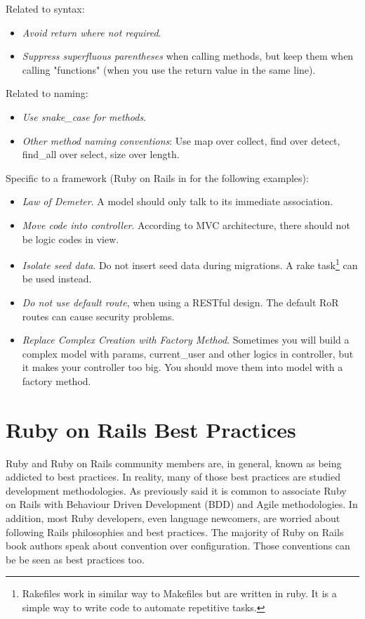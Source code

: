 Related to syntax:
\begin{itemize}
\item \emph{Avoid return where not required}.
\item \emph{Suppress superfluous parentheses} when calling methods, 
but keep them when calling "functions" (when you use the return value in the same line).
\end{itemize}

Related to naming:
\begin{itemize}
\item \emph{Use snake\_case for methods}.
\item \emph{Other method naming conventions}: Use map over collect, find over detect, find\_all over select, size over length.
\end{itemize}

Specific to a framework (Ruby on Rails in for the following examples):
\begin{itemize}
\item \emph{Law of Demeter}. A model should only talk to its immediate association.
\item \emph{Move code into controller}. According to MVC architecture, there should not be logic codes in view.
\item \emph{Isolate seed data}. Do not insert seed data during migrations. A 
rake task\footnote{ 
  Rakefiles work in similar way to Makefiles but are written in ruby. It is a simple way to write code to automate repetitive tasks. 
} can be used instead.
\item \emph{Do not use default route}, when using a RESTful design. The default RoR routes can cause security problems.
\item \emph{Replace Complex Creation with Factory Method}. Sometimes you will build a complex model with params, current\_user and other logics in controller, but it makes your controller too big. You should move them into model with a factory method.
\end{itemize}




\section{Ruby on Rails Best Practices} \label{sec:ror_best_practives}

Ruby and Ruby on Rails community members are, in general, known as being addicted to best practices.
In reality, many of those best practices are studied development methodologies.
As previously said it is common to associate Ruby on Rails with Behaviour Driven Development (BDD) and Agile methodologies.
In addition, most Ruby developers, even language newcomers, are worried about following Rails philosophies and best practices.
The majority of Ruby on Rails book authors speak about convention over configuration.
Those conventions can be be seen as best practices too.

